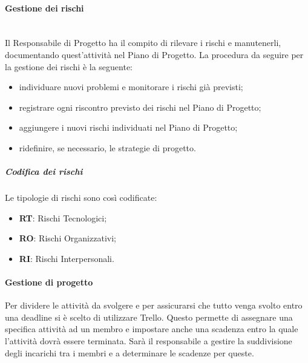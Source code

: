			\paragraph{Gestione dei rischi} \mbox{}\\
			Il Responsabile di Progetto ha il compito di rilevare i rischi e manutenerli, documentando quest'attività nel Piano di Progetto. La procedura da seguire per la gestione dei rischi è la seguente:
			\begin{itemize}
				\item individuare nuovi problemi e monitorare i rischi già previsti;
				\item registrare ogni riscontro previsto dei rischi nel Piano di Progetto;
				\item aggiungere i nuovi rischi individuati nel Piano di Progetto;
				\item ridefinire, se necessario, le strategie di progetto.
			\end{itemize}
				\subparagraph{Codifica dei rischi}
				Le tipologie di rischi sono così codificate:
				\begin{itemize}
					\item \textbf{RT}: Rischi Tecnologici;
					\item \textbf{RO}: Rischi Organizzativi;
					\item \textbf{RI}: Rischi Interpersonali.
				\end{itemize}
			\paragraph{Gestione di progetto}
			Per dividere le attività da svolgere e per assicurarsi che tutto venga svolto entro una deadline si è scelto di utilizzare Trello. Questo permette di assegnare una specifica attività ad un membro e impostare anche una scadenza entro la quale l'attività dovrà essere terminata. Sarà il responsabile a gestire la suddivisione degli incarichi tra i membri e a determinare le scadenze per queste.
